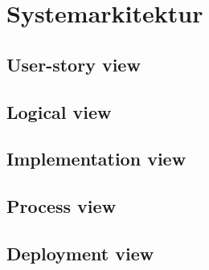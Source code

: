 \chapter{Systemarkitektur}

\lipsum[2]

\section{User-story view}

\section{Logical view}

\section{Implementation view} %

\section{Process view}

\section{Deployment view} %

